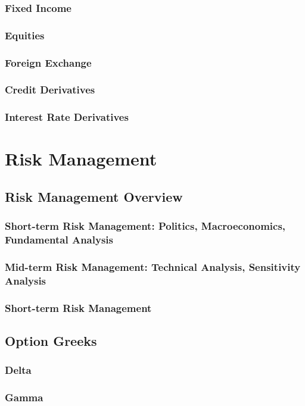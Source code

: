 \documentclass{book}
\begin{document}
\subsection{Fixed Income}
\subsection{Equities}
\subsection{Foreign Exchange}
\subsection{Credit Derivatives}
\subsection{Interest Rate Derivatives}

\chapter{Risk Management}
\section{Risk Management Overview}
\subsection{Short-term Risk Management: Politics, Macroeconomics, Fundamental Analysis}
\subsection{Mid-term Risk Management: Technical Analysis, Sensitivity Analysis}
\subsection{Short-term Risk Management}

\section{Option Greeks}
\subsection{Delta}
\subsection{Gamma}
\end{document}
